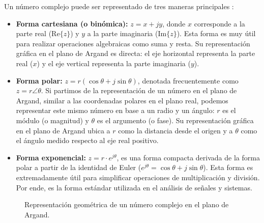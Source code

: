\documentclass[11pt,a4paper]{article}
\begin{document}
Un número complejo puede ser representado de tres maneras principales \cite{oppenheim1997}:
\begin{itemize}
    \item \textbf{Forma cartesiana (o binómica):} \( z = x + jy \), donde \( x \) corresponde a la parte real ($\text{Re}\{z\}$) y \( y \) a la parte imaginaria ($\text{Im}\{z\}$). Esta forma es muy útil para realizar operaciones algebraicas como suma y resta. Su representación gráfica en el plano de Argand es directa: el eje horizontal representa la parte real ($x$) y el eje vertical representa la parte imaginaria ($y$).
    \item \textbf{Forma polar:} \( z = r(\cos\theta + j\sin\theta) \), denotada frecuentemente como \( z = r\angle\theta \). Si partimos de la representación de un número en el plano de Argand, similar a las coordenadas polares en el plano real, podemos representar este mismo número en base a un radio y un ángulo: \( r \) es el módulo (o magnitud) y \( \theta \) es el argumento (o fase). Su representación gráfica en el plano de Argand ubica a \( r \) como la distancia desde el origen y a \( \theta \) como el ángulo medido respecto al eje real positivo.
    \item \textbf{Forma exponencial:} \( z = r \cdot e^{j\theta} \), es una forma compacta derivada de la forma polar a partir de la identidad de Euler (\( e^{j\theta} = \cos\theta + j\sin\theta \)). Esta forma es extremadamente útil para simplificar operaciones de multiplicación y división. Por ende, es la forma estándar utilizada en el análisis de señales y sistemas.
\end{itemize}

\begin{figure}[htbp]
    \centering
    \caption{Representación geométrica de un número complejo en el plano de Argand.}
    \label{fig:plano_argand}
\end{figure}
\end{document}
